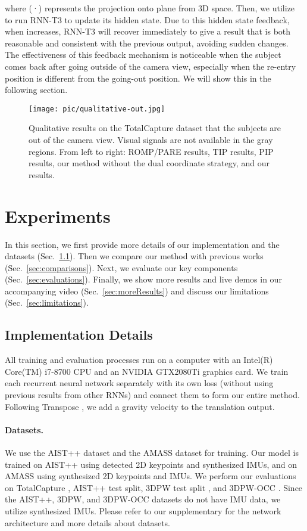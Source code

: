\documentclass[sigconf,nonacm=true]{acmart}
\begin{document}
where (·) represents the projection onto  plane from 3D space.
Then, we utilize  to run RNN-T3 to update its hidden state.
Due to this hidden state feedback, when  increases, RNN-T3 will recover immediately to give a result that is both reasonable and consistent with the previous output, avoiding sudden changes.
The effectiveness of this feedback mechanism is noticeable when the subject comes back after going outside of the camera view, especially when the re-entry position is different from the going-out position. We will show this in the following section.
% 
\begin{figure}
\texttt{[image: pic/qualitative-out.jpg]}
  \centering
  \caption{
   Qualitative results on the TotalCapture dataset that the subjects are out of the camera view. Visual signals are not available in the gray regions. From left to right: ROMP/PARE results, TIP results, PIP results, our method without the dual coordinate strategy, and our results.}
\label{fig:comparison2}
\end{figure}
\section{Experiments}
In this section, we first provide more details of our implementation and the datasets (Sec.~\ref{sec:implementation}).
Then we compare our method with previous works (Sec.~\ref{sec:comparisons}).
Next, we evaluate our key components (Sec.~\ref{sec:evaluations}).
Finally, we show more results and live demos in our accompanying video (Sec.~\ref{sec:moreResults}) and discuss our limitations (Sec.~\ref{sec:limitations}).
\subsection{Implementation Details}\label{sec:implementation}
All training and evaluation processes run on a computer with an Intel(R) Core(TM) i7-8700 CPU and an NVIDIA GTX2080Ti graphics card.
We train each recurrent neural network separately with its own loss (without using previous results from other RNNs) and connect them to form our entire method.
Following Transpose \cite{TransPose}, we add a gravity velocity to the translation output.


\paragraph{Datasets.}
We use the AIST++ dataset \cite{AIST++} and the AMASS dataset \cite{AMASS} for training.
Our model is trained on AIST++ using detected 2D keypoints and synthesized IMUs, and on AMASS using synthesized 2D keypoints and IMUs.
We perform our evaluations on TotalCapture \cite{TotalCapture}, AIST++ test split, 3DPW test split \cite{VIP}, and 3DPW-OCC \cite{VIP, ooh2020}.
Since the AIST++, 3DPW, and 3DPW-OCC datasets do not have IMU data, we utilize synthesized IMUs.
Please refer to our supplementary for the network architecture and more details about datasets.
\end{document}
